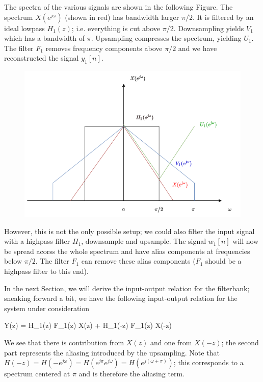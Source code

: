 The spectra of the various signals are shown in the following Figure. The spectrum $X(e^{j\omega})$ (shown in red) has bandwidth larger $\pi/2$. It is filtered by an ideal lowpass $H_1(z)$; i.e. everything is cut above $\pi/2$. Downsampling yields $V_1$ which has a bandwidth of $\pi$. Upsampling compresses the spectrum, yielding $U_1$. The filter $F_1$ removes frequency components above $\pi/2$ and we have reconstructed the signal $y_1[n]$.

\begin{figure}[H]
    \centering
    \includegraphics[scale=0.5]{images/2021-11-09-subband_08.png}
\end{figure}

However, this is not the only possible setup; we could also filter the input signal with a highpass filter $H_1$, downsample and upsample. The signal $w_1[n]$ will now be spread acorss the whole spectrum and have alias components at frequencies below $\pi/2$. The filter $F_1$ can remove these alias components ($F_1$ should be a highpass filter to this end).

In the next Section, we will derive the input-output relation for the filterbank; sneaking forward a bit, we have the following input-output relation for the system under consideration

\bee
Y(z) =  H_1(z) F_1(z) X(z) +  H_1(-z) F_1(z) X(-z)
\eee

We see that there is contribution from $X(z)$ and one from $X(-z)$; the second part represents the aliasing introduced by the upsampling. Note that $H(-z) = H(-e^{j \omega}) = H(e^{j \pi} e^{j \omega}) = H(e^{j(\omega + \pi)})$; this corresponds to a spectrum centered at $\pi$ and is therefore the aliasing term.

